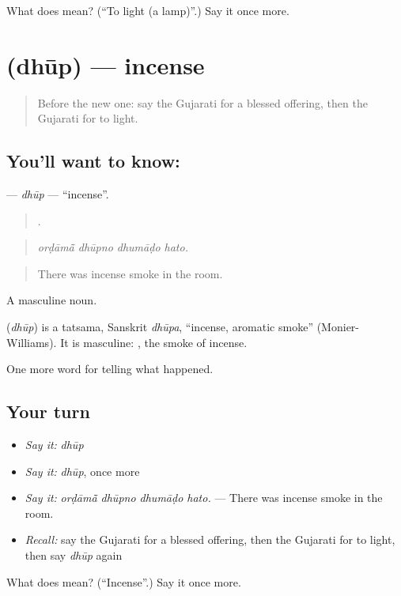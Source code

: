 \begin{tcolorbox}[breakable,colback=teal!4,colframe=teal!35!black,title={Before you move on}]
What does  mean? (\textquotedblleft{}To light (a lamp)\textquotedblright{}.) Say it once more.
\end{tcolorbox}
\section[\texorpdfstring{\gu{ધૂપ} (dhūp)}{ધૂપ (dhūp)}]{ (dhūp) — incense}

\label{lesson:GU-C328-dhup}



\begin{quote}
Before the new one: say the Gujarati for a blessed offering, then the Gujarati for to light.
\end{quote}

\subsection*{You'll want to know: }
\textbf{} — \emph{dhūp} — \textquotedblleft{}incense\textquotedblright{}.

\begin{quote}
   .
\end{quote}

\begin{quote}
\emph{orḍāmā̃ dhūpno dhumāḍo hato.}
\end{quote}

\begin{quote}
There was incense smoke in the room.
\end{quote}

A masculine noun.

\begin{cousinweb}
\textbf{} (\emph{dhūp}) is a tatsama, Sanskrit \emph{dhūpa}, \textquotedblleft{}incense, aromatic smoke\textquotedblright{} (Monier-Williams). It is masculine: \textbf{ }, the smoke of incense.
\end{cousinweb}

\begin{grammarlens}[title={What you've built}]
One more word for telling what happened.
\end{grammarlens}

\subsection*{Your turn}
\begin{itemize}
\raggedright
  \item \emph{Say it:} \emph{dhūp}
  \item \emph{Say it:} \emph{dhūp}, once more
  \item \emph{Say it:} \emph{orḍāmā̃ dhūpno dhumāḍo hato.} — There was incense smoke in the room.
  \item \emph{Recall:} say the Gujarati for a blessed offering, then the Gujarati for to light, then say \emph{dhūp} again
\end{itemize}

\begin{tcolorbox}[breakable,colback=teal!4,colframe=teal!35!black,title={Before you move on}]
What does  mean? (\textquotedblleft{}Incense\textquotedblright{}.) Say it once more.
\end{tcolorbox}
